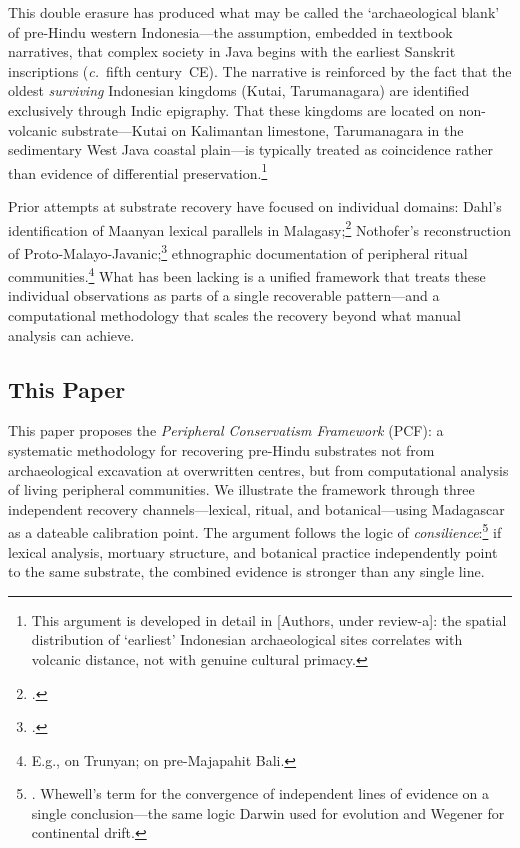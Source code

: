 \documentclass[12pt,a4paper]{article}
\begin{document}
This double erasure has produced what may be called the `archaeological blank' of pre-Hindu western Indonesia---the assumption, embedded in textbook narratives, that complex society in Java begins with the earliest Sanskrit inscriptions (\textit{c.}~fifth century~CE). The narrative is reinforced by the fact that the oldest \emph{surviving} Indonesian kingdoms (Kutai, Tarumanagara) are identified exclusively through Indic epigraphy. That these kingdoms are located on non-volcanic substrate---Kutai on Kalimantan limestone, Tarumanagara in the sedimentary West Java coastal plain---is typically treated as coincidence rather than evidence of differential preservation.\footnote{This argument is developed in detail in [Authors, under review-a]: the spatial distribution of `earliest' Indonesian archaeological sites correlates with volcanic distance, not with genuine cultural primacy.}

Prior attempts at substrate recovery have focused on individual domains: Dahl's identification of Maanyan lexical parallels in Malagasy;\footnote{\autocite{dahl1951malgache}.} Nothofer's reconstruction of Proto-Malayo-Javanic;\footnote{\autocite{nothofer1975reconstruction}.} ethnographic documentation of peripheral ritual communities.\footnote{E.g., \autocite{danandjaja1980kebudayaan} on Trunyan; \autocite{covarrubias1937bali} on pre-Majapahit Bali.} What has been lacking is a unified framework that treats these individual observations as parts of a single recoverable pattern---and a computational methodology that scales the recovery beyond what manual analysis can achieve.

\subsection{This Paper}

This paper proposes the \emph{Peripheral Conservatism Framework} (PCF): a systematic methodology for recovering pre-Hindu substrates not from archaeological excavation at overwritten centres, but from computational analysis of living peripheral communities. We illustrate the framework through three independent recovery channels---lexical, ritual, and botanical---using Madagascar as a dateable calibration point. The argument follows the logic of \emph{consilience}:\footnote{\autocite{whewell1840philosophy}. Whewell's term for the convergence of independent lines of evidence on a single conclusion---the same logic Darwin used for evolution and Wegener for continental drift.} if lexical analysis, mortuary structure, and botanical practice independently point to the same substrate, the combined evidence is stronger than any single line.
\end{document}
